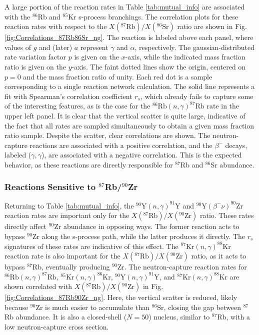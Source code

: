 A large portion of the reaction rates in Table \ref{tab:mutual_info} are associated with the $^{86}$Rb and $^{85}$Kr s-process branchings. The correlation plots for these reaction rates with respect to the $X(^{87}\mathrm{Rb})/X(^{86}\mathrm{Sr})$ ratio are shown in Fig. \ref{fig:Correlations_87Rb86Sr_ng}. The reaction is labeled above each panel, where values of $g$ and (later) $a$ represent $\gamma$ and $\alpha$, respectively. The gaussian-distributed rate variation factor $p$ is given on the $x$-axis, while the indicated mass fraction ratio is given on the $y$-axis. The faint dotted lines show the origin, centered on $p=0$ and the mass fraction ratio of unity. Each red dot is a sample corresponding to a single reaction network calculation. The solid line represents a fit with Spearman's correlation coefficient $r_{s}$, which already fails to capture some of the interesting features, as is the case for the $^{86}\mathrm{Rb}(n,\gamma)^{87}\mathrm{Rb}$ rate in the upper left panel. It is clear that the vertical scatter is quite large, indicative of the fact that all rates are sampled simultaneously to obtain a given mass fraction ratio sample. Despite the scatter, clear correlations are shown. The neutron-capture reactions are associated with a positive correlation, and the $\beta^{-}$ decays, labeled ($\gamma,\gamma$), are associated with a negative correlation. This is the expected behavior, as these reactions are directly responsible for $^{87}$Rb and $^{86}$Sr abundance.

\subsubsection{Reactions Sensitive to $^{87}$Rb/$^{90}$Zr}

Returning to Table \ref{tab:mutual_info}, the $^{90}\mathrm{Y}(n,\gamma)^{91}\mathrm{Y}$ and $^{90}\mathrm{Y}(\beta^{-}\nu)^{90}\mathrm{Zr}$ reaction rates are important only for the $X(^{87}\mathrm{Rb})/X(^{90}\mathrm{Zr})$ ratio. These rates directly affect $^{90}$Zr abundance in opposing ways. The former reaction acts to bypass $^{90}$Zr along the s-process path, while the latter produces it directly. The $r_{s}$ signatures of these rates are indicative of this effect. The $^{87}\mathrm{Kr}(n,\gamma)^{88}\mathrm{Kr}$ reaction rate is also important for the $X(^{87}\mathrm{Rb})/X(^{90}\mathrm{Zr})$ ratio, as it acts to bypass $^{87}$Rb, eventually producing $^{90}$Zr. The neutron-capture reaction rates for $^{86}\mathrm{Rb}(n,\gamma)^{87}\mathrm{Rb}$, $^{85}\mathrm{Kr}(n,\gamma)^{86}\mathrm{Kr}$, $^{90}\mathrm{Y}(n,\gamma)^{91}\mathrm{Y}$, and $^{87}\mathrm{Kr}(n,\gamma)^{88}\mathrm{Kr}$ are shown correlated with $X(^{87}\mathrm{Rb})/X(^{90}\mathrm{Zr})$ in Fig. \ref{fig:Correlations_87Rb90Zr_ng}. Here, the vertical scatter is reduced, likely because $^{90}$Zr is much easier to accumulate than $^{86}$Sr, closing the gap between $^{87}$Rb abundance. It is also a closed-shell ($N=50$) nucleus, similar to $^{87}$Rb, with a low neutron-capture cross section.

